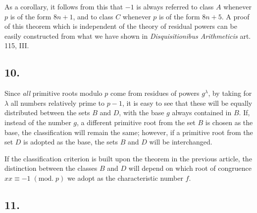\documentclass[twoside,12pt]{memoir}
\renewcommand{\pmod}[1]{\;(\textrm{mod.}\;#1)}
\begin{document}
As a corollary, it follows from this that \(-1\) is always referred to class \(A\) whenever \(p\) is of the form \(8n+1\), and to class \(C\) whenever \(p\) is of the form \(8n+5\).  A proof of this theorem which is independent of the theory of residual powers can be easily constructed from what we have shown in \textit{Disquisitionibus Arithmeticis} art. 115, III.

\subsection*{10.}
 
Since \textit{all} primitive roots modulo \(p\) come from residues of powers \(g^{\lambda}\), by taking for \(\lambda\) all numbers relatively prime to \(p-1\), it is easy to see that these will be equally distributed between the sets \({B}\) and \({D}\), with the base \(g\) always contained in \({B}\). If, instead of the number \(g\), a different primitive root from the set \(B\) is chosen as the base, the classification will remain the same; however, if a primitive root from the set \(D\) is adopted as the base, the sets \(B\) and \(D\) will be interchanged.\pagebreak%
 
If the classification criterion is built upon the theorem in the previous article, the distinction between the classes \(B\) and \(D\) will depend on which root of congruence \(x x \equiv-1\pmod{p}\) we adopt as the characteristic number \(f\).

\subsection*{11.}
 
\end{document}

